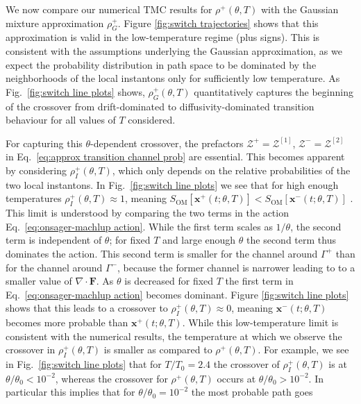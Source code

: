 We now compare our numerical TMC results for $\rho^{+}(\theta,T)$ with
the Gaussian mixture approximation $\rho_{G}^{+}$. Figure \ref{fig:switch trajectories} shows that this approximation is valid in the low-temperature regime
(plus signs). This is consistent with the assumptions underlying the
Gaussian approximation, as we expect the probability distribution
in path space to be dominated by the neighborhoods of the local instantons
only for sufficiently low temperature. As Fig.~\ref{fig:switch line plots} shows, $\rho_{G}^{+}(\theta,T)$ quantitatively captures the beginning
of the crossover from drift-dominated to diffusivity-dominated transition
behaviour for all values of $T$ considered.

For capturing this $\theta$-dependent crossover, the prefactors $\mathcal{Z}^{+}=\mathcal{Z}^{[1]}$,
$\mathcal{Z}^{-}=\mathcal{Z}^{[2]}$ in Eq.~\ref{eq:approx transition channel prob}
are essential. This becomes apparent by considering $\rho_{I}^{+}(\theta,T)$,
which only depends on the relative probabilities of the two local
instantons. In Fig.~\ref{fig:switch line plots} we see that for high enough
temperatures $\rho_{I}^{+}(\theta,T)\approx1$, meaning $S_{\text{OM}}[\mathbf{x}^{+}(t; \theta, T)]<S_{\text{OM}}[\mathbf{x}^{-}(t; \theta, T)]$
\citep{adibStochasticActionsDiffusive2008}. This limit is understood
by comparing the two terms in the action Eq.~\ref{eq:onsager-machlup action}.
While the first term scales as $1/\theta$, the second term is independent
of $\theta$; for fixed $T$ and large enough $\theta$ the second
term thus dominates the action. This second term is smaller for the
channel around $\Gamma^{+}$ than for the channel around $\Gamma^{-}$,
because the former channel is narrower leading to to a smaller value
of $\nabla\cdot\mathbf{F}$. As $\theta$ is decreased for fixed $T$
the first term in Eq.~\ref{eq:onsager-machlup action} becomes
dominant. Figure \ref{fig:switch line plots} shows that this leads to a
crossover to $\rho_{I}^{+}(\theta,T)\approx0$, meaning $\mathbf{x}^{-}(t;\theta,T)$
becomes more probable than $\mathbf{x}^{+}(t;\theta,T)$. While this low-temperature
limit is consistent with the numerical results, the temperature at
which we observe the crossover in $\rho_{I}^{+}(\theta,T)$ is smaller
as compared to $\rho^{+}(\theta,T)$. For example, we see in Fig.~\ref{fig:switch line plots} that for $T/T_{0}=2.4$ the crossover of $\rho_{I}^{+}(\theta,T)$
is at $\theta/\theta_{0}<10^{-2}$, whereas the crossover for $\rho^{+}(\theta,T)$
occurs at $\theta/\theta_{0}>10^{-2}$. In particular this implies
that for $\theta/\theta_{0}=10^{-2}$ the most probable path goes
